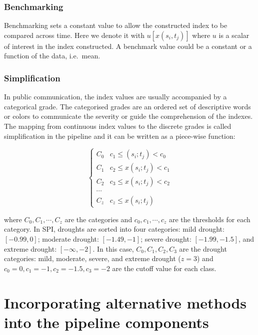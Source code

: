 \documentclass[
]{interact}
\begin{document}
\hypertarget{benchmarking}{%
\subsubsection{Benchmarking}\label{benchmarking}}

Benchmarking sets a constant value to allow the constructed index to be
compared across time. Here we denote it with \(u[x(s_i, t_j)]\) where
\(u\) is a scalar of interest in the index constructed. A benchmark
value could be a constant or a function of the data, i.e.~mean.

\hypertarget{simplification}{%
\subsubsection{Simplification}\label{simplification}}

In public communication, the index values are usually accompanied by a
categorical grade. The categorised grades are an ordered set of
descriptive words or colors to communicate the severity or guide the
comprehension of the indexes. The mapping from continuous index values
to the discrete grades is called simplification in the pipeline and it
can be written as a piece-wise function:

\begin{equation}
\begin{cases}
C_0 & c_1 \leq (s_i; t_j) < c_0 \\
C_1 & c_2 \leq x(s_i; t_j) < c_1 \\
C_2 & c_3 \leq x(s_i; t_j) < c_2 \\
\cdots \\
C_z & c_z \leq x(s_i; t_j)
\end{cases}
\end{equation}

where \(C_0, C_1,\cdots ,C_z\) are the categories and
\(c_0, c_1, \cdots, c_z\) are the thresholds for each category. In SPI,
droughts are sorted into four categories: mild drought: \([-0.99, 0]\);
moderate drought: \([-1.49, -1]\); severe drought: \([-1.99, -1.5]\),
and extreme drought: \([-\infty, -2]\). In this case,
\(C_0, C_1, C_2, C_3\) are the drought categories: mild, moderate,
severe, and extreme drought (\(z = 3\)) and
\(c_0 =0, c_1 = -1, c_2 = -1.5, c_3 = -2\) are the cutoff value for each
class.

\hypertarget{sec-dev}{%
\section{Incorporating alternative methods into the pipeline
components}\label{sec-dev}}
\end{document}
